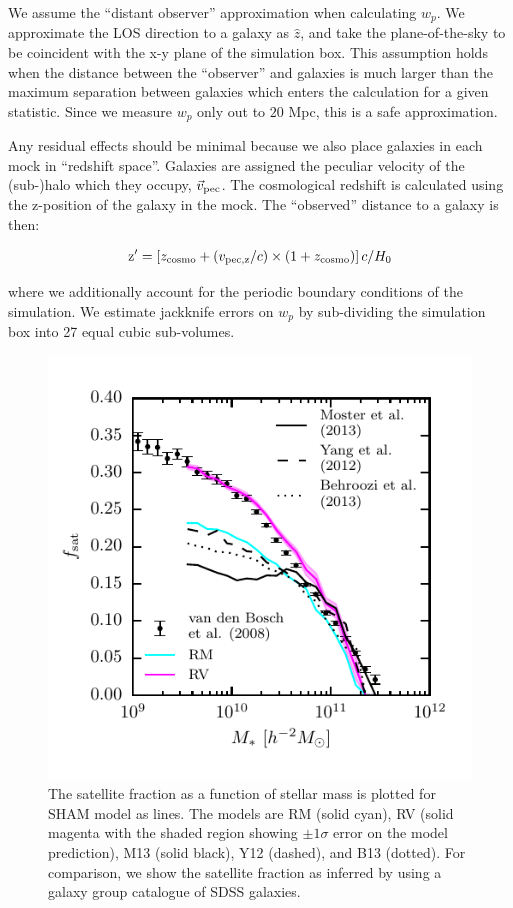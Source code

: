 \documentclass[a4paper,fleqn,usenatbib]{mnras}
\begin{document}
We assume the ``distant observer'' approximation when calculating $w_{p}$.  We approximate the LOS direction to a galaxy as $\hat{z}$, and take the plane-of-the-sky to be coincident with the x-y plane of the simulation box.  This assumption holds when the distance between the ``observer'' and galaxies is much larger than the maximum separation between galaxies which enters the calculation for a given statistic.  Since we measure $w_{p}$ only out to $20$ Mpc, this is a safe approximation.

Any residual effects should be minimal because we also place galaxies in each mock in ``redshift space''.  Galaxies are assigned the peculiar velocity of the (sub-)halo which they occupy, $\vec{v}_{\rm pec}$.  The cosmological redshift is calculated using the z-position of the galaxy in the mock.  The ``observed'' distance to a galaxy is then:
%
\begin{linenomath}
\begin{equation}
\mathrm{z}^{\prime} = \left[ z_{\rm cosmo} + ({v}_{\rm pec,z}/c) \times (1+ z_{\rm cosmo}) \right] c/H_0
\end{equation}
\end{linenomath}
%
where we additionally account for the periodic boundary conditions of the simulation.  We estimate jackknife errors on $w_p$ by sub-dividing the simulation box into 27 equal cubic sub-volumes.

\begin{figure}
    \includegraphics{figures/f_sat_mstar.pdf}
    \caption{The satellite fraction as a function of stellar mass is plotted for SHAM model as lines.  The models are RM (solid cyan), RV (solid magenta with the shaded region showing $\pm 1\sigma$ error on the model prediction), M13 (solid black), Y12 (dashed), and B13 (dotted).  For comparison, we show the satellite fraction as inferred by \citet{vandenBosch:2008fv} using a galaxy group catalogue of SDSS galaxies.}
    \label{fig:f_sat_mstar}
\end{figure}
\end{document}

